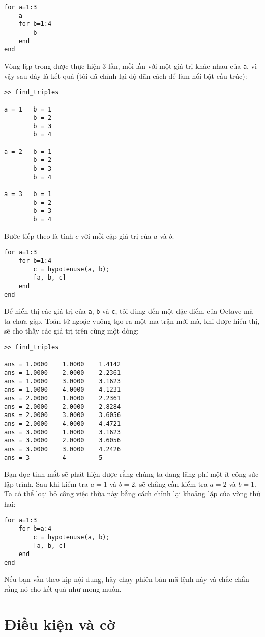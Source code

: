 \documentclass[12pt]{book}
\begin{document}
\begin{verbatim}
for a=1:3
    a
    for b=1:4
        b
    end
end
\end{verbatim}

Vòng lặp trong được thực hiện 3 lần, mỗi lần với một giá trị 
khác nhau của {\tt a}, vì vậy sau đây là kết quả (tôi đã chỉnh
lại độ dãn cách để làm nổi bật cấu trúc):

\begin{verbatim}
>> find_triples

a = 1   b = 1
        b = 2
        b = 3
        b = 4

a = 2   b = 1
        b = 2
        b = 3
        b = 4

a = 3   b = 1
        b = 2
        b = 3
        b = 4
\end{verbatim}
%
Bước tiếp theo là tính $c$ với mỗi cặp giá trị của $a$ và $b$.

\begin{verbatim}
for a=1:3
    for b=1:4
        c = hypotenuse(a, b);
        [a, b, c]
    end
end
\end{verbatim}
%
Để hiển thị các giá trị của {\tt a}, {\tt b} và {\tt c}, tôi
dùng đến một đặc điểm của Octave mà ta chưa gặp. Toán tử
ngoặc vuông tạo ra một ma trận mới mà, khi được hiển thị, sẽ
cho thấy các giá trị trên cùng một dòng:

\begin{verbatim}
>> find_triples

ans = 1.0000    1.0000    1.4142
ans = 1.0000    2.0000    2.2361
ans = 1.0000    3.0000    3.1623
ans = 1.0000    4.0000    4.1231
ans = 2.0000    1.0000    2.2361
ans = 2.0000    2.0000    2.8284
ans = 2.0000    3.0000    3.6056
ans = 2.0000    4.0000    4.4721
ans = 3.0000    1.0000    3.1623
ans = 3.0000    2.0000    3.6056
ans = 3.0000    3.0000    4.2426
ans = 3         4         5
\end{verbatim}
%
Bạn đọc tinh mắt sẽ phát hiện được rằng chúng ta đang lãng phí một
ít công sức lập trình. Sau khi kiểm tra $a=1$ và $b=2$, sẽ chẳng cần
kiểm tra $a=2$ và $b=1$. Ta có thể loại bỏ công việc thừa
này bằng cách chỉnh lại khoảng lặp của vòng thứ hai:

\begin{verbatim}
for a=1:3
    for b=a:4
        c = hypotenuse(a, b);
        [a, b, c]
    end
end
\end{verbatim}
%
Nếu bạn vẫn theo kịp nội dung, hãy chạy phiên bản mã lệnh này và
chắc chắn rằng nó cho kết quả như mong muốn.


\section{Điều kiện và cờ}
\end{document}
